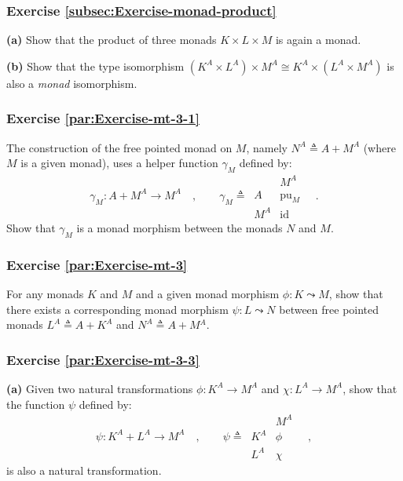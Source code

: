 \subsubsection{Exercise \label{subsec:Exercise-monad-product}\ref{subsec:Exercise-monad-product}}

\textbf{(a)} Show that the product of three monads $K\times L\times M$
is again a monad.

\textbf{(b)} Show that the type isomorphism $(K^{A}\times L^{A})\times M^{A}\cong K^{A}\times(L^{A}\times M^{A})$
is also a \emph{monad} isomorphism.

\subsubsection{Exercise \label{par:Exercise-mt-3-1}\ref{par:Exercise-mt-3-1}}

The construction of the free pointed monad on $M$, namely $N^{A}\triangleq A+M^{A}$
(where $M$ is a given monad), uses a helper function $\gamma_{M}$
defined by:
\[
\gamma_{M}:A+M^{A}\rightarrow M^{A}\quad,\quad\quad\gamma_{M}\triangleq\,\begin{array}{|c||c|}
 & M^{A}\\
\hline A & \text{pu}_{M}\\
M^{A} & \text{id}
\end{array}\quad.
\]
Show that $\gamma_{M}$ is a monad morphism between the monads $N$
and $M$.

\subsubsection{Exercise \label{par:Exercise-mt-3}\ref{par:Exercise-mt-3}}

For any monads $K$ and $M$ and a given monad morphism $\phi:K\leadsto M$,
show that there exists a corresponding monad morphism $\psi:L\leadsto N$
between free pointed monads $L^{A}\triangleq A+K^{A}$ and $N^{A}\triangleq A+M{}^{A}$.

\subsubsection{Exercise \label{par:Exercise-mt-3-3}\ref{par:Exercise-mt-3-3}}

\textbf{(a)} Given two natural transformations $\phi:K^{A}\rightarrow M^{A}$
and $\chi:L^{A}\rightarrow M^{A}$, show that the function $\psi$
defined by:
\[
\psi:K^{A}+L^{A}\rightarrow M^{A}\quad,\quad\quad\psi\triangleq\,\begin{array}{|c||c|}
 & M^{A}\\
\hline K^{A} & \phi\\
L^{A} & \chi
\end{array}\quad,
\]
 is also a natural transformation.

